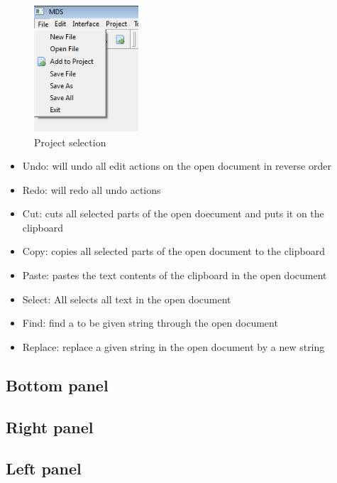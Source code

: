                         \begin{figure}
                                \centering
                                \includegraphics[width=110pt]{img/menu_file.png}
                                \caption{Project selection}
                        \end{figure}

                        \begin{itemize}
                            \item Undo: will undo all edit actions on the open document in reverse order
                            \item Redo: will redo all undo actions
                            \item Cut: cuts all selected parts of the open doecument and puts it on the clipboard
                            \item Copy: copies all selected parts of the open document to the clipboard
                            \item Paste: pastes the text contents of the clipboard in the open document
                            \item Select: All selects all text in the open document
                            \item Find: find a to be given string through the open document
                            \item Replace: replace a given string in the open document by a new string
                        \end{itemize}

                \subsection{Bottom panel}
                \subsection{Right panel}
                \subsection{Left panel}
